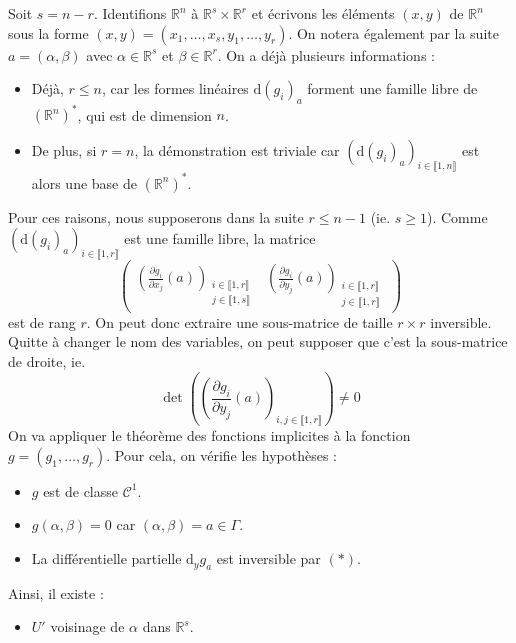 	\begin{demonstration}
		Soit $s = n-r$. Identifions $\mathbb{R}^n$ à $\mathbb{R}^s \times \mathbb{R}^r$ et écrivons les éléments $(x, y)$ de $\mathbb{R}^n$ sous la forme $(x, y) = (x_1, \dots, x_s, y_1, \dots, y_r)$. On notera également par la suite $a = (\alpha, \beta)$ avec $\alpha \in \mathbb{R}^s$ et $\beta \in \mathbb{R}^r$. On a déjà plusieurs informations :
		\begin{itemize}
			\item Déjà, $r \leq n$, car les formes linéaires $\mathrm{d}(g_i)_a$ forment une famille libre de $(\mathbb{R}^n)^*$, qui est de dimension $n$.
			\item De plus, si $r = n$, la démonstration est triviale car $(\mathrm{d}(g_i)_a)_{i \in \llbracket 1, n \rrbracket}$ est alors une base de $(\mathbb{R}^n)^*$.
		\end{itemize}
		Pour ces raisons, nous supposerons dans la suite $r \leq n-1$ (ie. $s \geq 1$).
		\newpar
		Comme $(\mathrm{d}(g_i)_a)_{i \in \llbracket 1, r \rrbracket}$ est une famille libre, la matrice
		\[ \begin{pmatrix}
			\left( \frac{\partial g_i}{\partial x_j}(a) \right)_{\substack{i \in \llbracket 1, r \rrbracket \\ j \in \llbracket 1, s \rrbracket}} & \left( \frac{\partial g_i}{\partial y_j}(a) \right)_{\substack{i \in \llbracket 1, r \rrbracket \\ j \in \llbracket 1, r \rrbracket}}
		\end{pmatrix} \]
		est de rang $r$. On peut donc extraire une sous-matrice de taille $r \times r$ inversible. Quitte à changer le nom des variables, on peut supposer que c'est la sous-matrice de droite, ie.
		\[ \det \left( \left( \frac{\partial g_i}{\partial y_j}(a) \right)_{i, j \in \llbracket 1, r \rrbracket} \right) \neq 0 \tag{$*$} \]
		On va appliquer le théorème des fonctions implicites à la fonction $g = (g_1, \dots, g_r)$. Pour cela, on vérifie les hypothèses :
		\begin{itemize}
			\item $g$ est de classe $\mathcal{C}^1$.
			\item $g(\alpha, \beta) = 0$ car $(\alpha, \beta) = a \in \Gamma$.
			\item La différentielle partielle $\mathrm{d}_y g_a$ est inversible par $(*)$.
		\end{itemize}
		Ainsi, il existe :
		\begin{itemize}
			\item $U'$ voisinage de $\alpha$ dans $\mathbb{R}^s$.

\end{itemize}
\end{demonstration}
